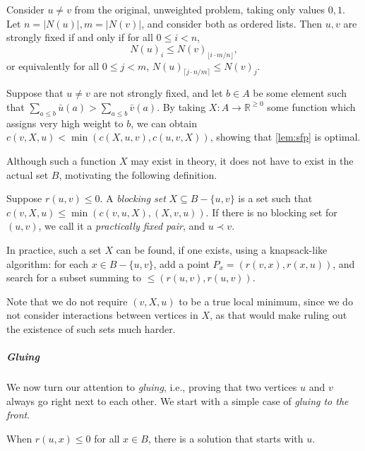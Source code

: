 \documentclass[a4paper,UKenglish,cleveref, autoref, thm-restate]{lipics-v2021}
\renewcommand{\b}{\prec}
\begin{document}
\begin{remark}
    Consider $u \neq v$ from the original, unweighted problem, taking only values $0, 1$. Let 
    $n = |N(u)|, m = |N(v)|$, and consider both as ordered lists. Then $u, v$ are strongly
    fixed if and only if for all $0 \leq i < n$,
    \[
        N(u)_i \leq N(v)_{\lfloor i\cdot m/n \rfloor},
    \]
    or equivalently for all $0 \leq j < m$, $N(u)_{\lceil j\cdot n/m \rceil} \leq N(v)_j$.
\end{remark}

\begin{remark}\label{rem:strongest}
    Suppose that $u \neq v$ are not strongly fixed, and let $b \in A$ be some element such
    that $\sum_{a \leq b} \bar u(a) > \sum_{a \leq b} \bar v(a)$. By taking $X: A \to \mathbb
    R^{\geq 0}$ some function which assigns very high
    weight to $b$, we can obtain $c(v, X, u) < \min(c(X, u, v), c(u, v, X))$, showing that
    \cref{lem:sfp} is optimal.
\end{remark}
Although such a function $X$ may exist in theory, it does
not have to exist in the actual set $B$, motivating the following definition.

\begin{lemma}\label{pfp}
  Suppose $r(u,v)\leq 0$.
    A \emph{blocking set} $X\subseteq B-\{u,v\}$ is a set such that $c(v,X,u) \leq \min(c(v, u,
    X), (X, v, u))$.  If there is no blocking set for $(u, v)$, we call it a
    \emph{practically fixed pair}, and $u\b v$.
\end{lemma}

In practice, such a set $X$ can be found, if one exists, using a knapsack-like algorithm: for
each $x\in B-\{u,v\}$, add a point $P_x = (r(v, x), r(x, u))$, and search for a subset summing
to ${\leq{}(r(u, v), r(u, v))}$.

Note that we do not require $(v, X, u)$ to be a true local minimum, since we do
not consider interactions between vertices in $X$, as that would make ruling out the
existence of such sets much harder.

\subparagraph{Gluing}
We now turn our attention to \emph{gluing}, i.e., proving that two vertices $u$
and $v$ always go right next to each other. We start with a simple case of
\emph{gluing to the front}.

\begin{lemma}[Greedy]\label{greedy}
  When $r(u, x)\leq 0$ for all $x\in B$, there is a solution that
  starts with $u$.
\end{lemma}
\end{document}
